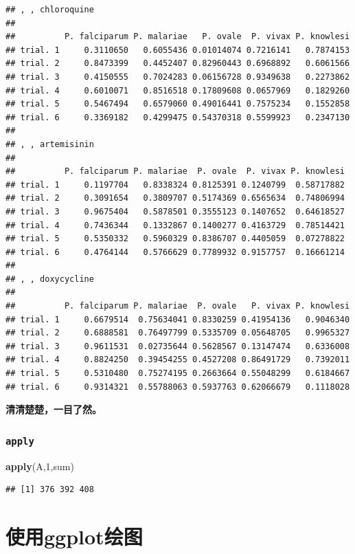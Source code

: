 \documentclass[]{book}
\newenvironment{Shaded}{\begin{snugshade}}{\end{snugshade}}
\newcommand{\DecValTok}[1]{\textcolor[rgb]{0.00,0.00,0.81}{#1}}
\newcommand{\KeywordTok}[1]{\textcolor[rgb]{0.13,0.29,0.53}{\textbf{#1}}}
\newcommand{\NormalTok}[1]{#1}
\begin{document}
\begin{verbatim}
## , , chloroquine
## 
##          P. falciparum P. malariae   P. ovale  P. vivax P. knowlesi
## trial. 1     0.3110650   0.6055436 0.01014074 0.7216141   0.7874153
## trial. 2     0.8473399   0.4452407 0.82960443 0.6968892   0.6061566
## trial. 3     0.4150555   0.7024283 0.06156728 0.9349638   0.2273862
## trial. 4     0.6010071   0.8516518 0.17809608 0.0657969   0.1829260
## trial. 5     0.5467494   0.6579060 0.49016441 0.7575234   0.1552858
## trial. 6     0.3369182   0.4299475 0.54370318 0.5599923   0.2347130
## 
## , , artemisinin
## 
##          P. falciparum P. malariae  P. ovale  P. vivax P. knowlesi
## trial. 1     0.1197704   0.8338324 0.8125391 0.1240799  0.58717882
## trial. 2     0.3091654   0.3809707 0.5174369 0.6565634  0.74806994
## trial. 3     0.9675404   0.5878501 0.3555123 0.1407652  0.64618527
## trial. 4     0.7436344   0.1332867 0.1400277 0.4163729  0.78514421
## trial. 5     0.5350332   0.5960329 0.8386707 0.4405059  0.07278822
## trial. 6     0.4764144   0.5766629 0.7789932 0.9157757  0.16661214
## 
## , , doxycycline
## 
##          P. falciparum P. malariae  P. ovale   P. vivax P. knowlesi
## trial. 1     0.6679514  0.75634041 0.8330259 0.41954136   0.9046340
## trial. 2     0.6888581  0.76497799 0.5335709 0.05648705   0.9965327
## trial. 3     0.9611531  0.02735644 0.5628567 0.13147474   0.6336008
## trial. 4     0.8824250  0.39454255 0.4527208 0.86491729   0.7392011
## trial. 5     0.5310480  0.75274195 0.2663664 0.55048299   0.6184667
## trial. 6     0.9314321  0.55788063 0.5937763 0.62066679   0.1118028
\end{verbatim}

\textbf{清清楚楚，一目了然。}

\hypertarget{apply}{%
\subsection{\texorpdfstring{\texttt{apply}}{apply}}\label{apply}}

\begin{Shaded}
\begin{Highlighting}[]
\KeywordTok{apply}\NormalTok{(A,}\DecValTok{1}\NormalTok{,sum)}
\end{Highlighting}
\end{Shaded}

\begin{verbatim}
## [1] 376 392 408
\end{verbatim}

\hypertarget{graphics}{%
\chapter{使用ggplot绘图}\label{graphics}}
\end{document}
